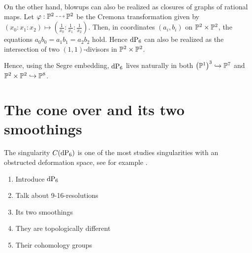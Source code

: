 On the other hand, blowups can also be realized as closures of graphs of rational maps. Let $\varphi: \P^2 \rmap \P^2$ be the Cremona transformation given by $(x_0:x_1:x_2) \mapsto \left( \frac 1{x_0}: \frac 1{x_1}:\frac 1{x_2} \right)$. Then, in coordinates $(a_i,b_i)$ on $\P^2 \times \P^2$, the equations $a_0b_0=a_1b_1=a_2b_2$ hold. Hence $\dP6$ can also be realized as the intersection of two $(1,1)$-divisors in $\P^2 \times \P^2$. 

Hence, using the Segre embedding, $\dP6$ lives naturally in both ${\left( \P^1 \right)}^3 \hookrightarrow \P^7$ and $\P^2 \times \P^2 \hookrightarrow \P^8$. 

\section{The cone over \texorpdfstring{}{dP6} and its two smoothings}

The singularity $C(\dP6)$ is one of the most studies singularities with an obstructed deformation space, see for example \cite{altmann_versaldeformation}.

\begin{enumerate}
	\item Introduce $\dP6$
	\item Talk about 9-16-resolutions
	\item Its two smoothings
	\item They are topologically different
	\item Their cohomology groups
\end{enumerate}

